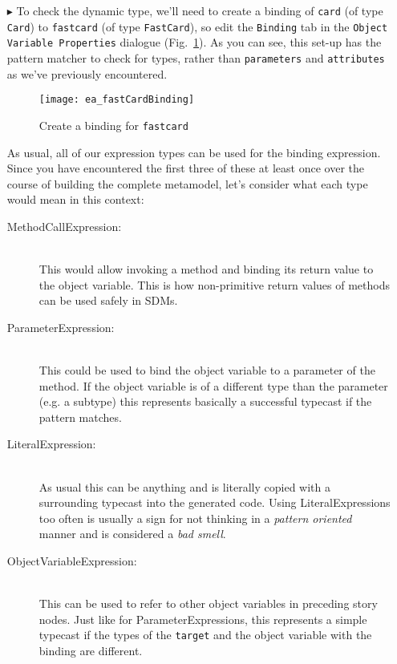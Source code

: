 \begin{itemize}
\vspace{0.5cm}
 
\item[$\blacktriangleright$] To check the dynamic type, we'll need to create a binding of \texttt{card} (of type \texttt{Card}) to \texttt{fastcard} (of
type \texttt{FastCard}), so edit the \texttt{Binding} tab in the \texttt{Object Variable Properties} dialogue (Fig.~\ref{fig:fastCardBinding}). As you can see,
this set-up has the pattern matcher to check for types, rather than \texttt{parameters} and \texttt{attributes} as we've previously encountered.
  
\begin{figure}[htbp]
\begin{center}
  \texttt{[image: ea\_fastCardBinding]}
  \caption{Create a binding for \texttt{fastcard}}  
  \label{fig:fastCardBinding}
\end{center}
\end{figure}

 \clearpage

As usual, all of our expression types can be used for the binding expression. Since you have encountered the first three of these at least once over the course
of building the complete metamodel, let's consider what each type would mean in this context:
\begin{description}
  \item[MethodCallExpression:]~\\ This would allow invoking a method and binding
  its return value to the object variable.  This is how non-primitive return
  values of methods can be used safely in SDMs.
  
  \item[ParameterExpression:]~\\ This could be used to bind the object variable
  to a parameter of the method.  If the object variable is of a different type
  than the parameter (e.g. a subtype) this represents basically a successful
  typecast if the pattern matches.
  
  \item[LiteralExpression:]~\\ As usual this can be anything and is literally
  copied with a surrounding typecast into the generated code.  Using
  LiteralExpressions too often is usually a sign for not thinking in a
  \emph{pattern oriented} manner and is considered a \emph{bad smell}.

  
  \item[ObjectVariableExpression:]~\\ This can be used to refer to other object
  variables in preceding story nodes.  Just like for ParameterExpressions, this
  represents a simple typecast if the types of the \texttt{target} and the
  object variable with the binding are different.
\end{description}


\end{itemize}
